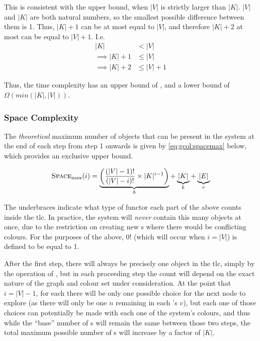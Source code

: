 This is consistent with the upper bound, when \(|V|\) is strictly larger than \(|K|\).  \(|V|\) and \(|K|\) are both natural numbers, so the smallest possible difference between them is 1.  Thus, \(|K| + 1\) can be at most equal to \(|V|\), and therefore \(|K| + 2\) at most can be equal to \(|V| + 1\).  I.e.
\begin{align*}
    |K| &< |V|\\
    \implies |K| + 1 &\leq |V|\\
    \implies |K| + 2 &\leq |V| + 1
\end{align*}

Thus, the time complexity has an upper bound of , and a lower bound of \(\Omega(min(|K|, |V|))\).

\subsubsection{Space Complexity}

The \emph{theoretical} maximum number of objects that can be present in the system at the end of each step from step 1 onwards is given by \cref{eq:gcol:spacemax} below, which provides an exclusive upper bound.

\begin{equation}\label{eq:gcol:spacemax}
    \textsc{Space}_{\text{max}}(i) = \underbrace{\bigg(\frac{(|V| - 1)!}{(|V| - i)!} \times |K|^{i-1}\bigg)}_{b} + \underbrace{|K|}_{k} + \underbrace{|E|}_{e}
\end{equation}

The underbraces indicate what type of \gls{functor} each part of the above counts inside the \gls{tlc}.  In practice, the system will \emph{never} contain this many objects at once, due to the restriction on creating new \bo{}s where there would be conflicting colours.  For the purposes of the above, \(0!\) (which will occur when \(i = |V|\)) is defined to be equal to 1.

After the first step, there will always be precisely one \bo{} object in the \gls{tlc}, simply by the operation of , but in each proceeding step the count will depend on the exact nature of the graph and colour set under consideration.  At the point that \(i = |V| - 1\), for each \bo{} there will be only one possible choice for the next node to explore (as there will only be one \(n\) remaining in each \bo{}'s \(v\)), but each one of those choices can potentially be made with each one of the system's colours, and thus while the ``base'' number of \bo{}s will remain the same between those two steps, the total maximum possible number of \bo{}s will increase by a factor of \(|K|\).

